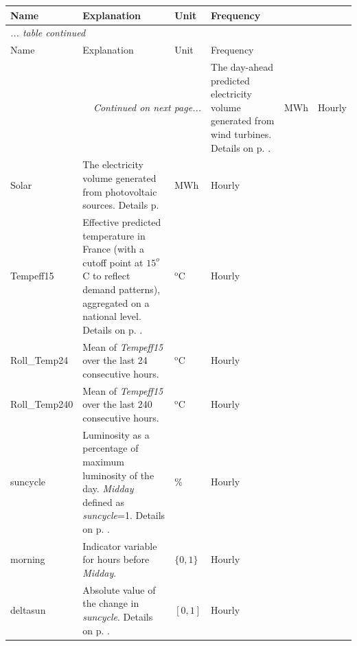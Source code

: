 \begin{center}
\begin{longtable}{p{2cm} p{8.5cm} p{1.3cm}  p{1.5cm}}
 \multicolumn{1}{l}{Name}   & Explanation & Unit  & Frequency \\
\midrule
 \endfirsthead
\multicolumn{3}{l}{\emph{... table \thetable{} continued}} \\
 \multicolumn{1}{l}{Name}   & Explanation  & Unit  & Frequency \\
\midrule
\endhead
\midrule
\multicolumn{3}{r}{\emph{Continued on next page...}}
\endfoot
\endlastfoot
Wind1DA & The day-ahead predicted electricity volume generated from wind turbines. 
Details on p. \pageref{Wind1DA}. & MWh  & Hourly   \\
\midrule 
Solar & The electricity volume generated from photovoltaic sources. 
Details p. \pageref{Solar} & MWh &  Hourly \\  
\midrule
Tempeff15 & 
Effective predicted temperature in France (with a cutoff point at $15^o$C to reflect demand patterns), aggregated on a national level.
Details on p. \pageref{Tempeff15}. & $^\text{o}$C & Hourly\\
\midrule
 Roll\_Temp24 &  Mean of \emph{Tempeff15} over the last 24 consecutive hours. %
  &  $^\text{o}$C   & Hourly \\
\midrule
 Roll\_Temp240 & Mean of \emph{Tempeff15} over the last 240 consecutive hours. %
 &  $^\text{o}$C   & Hourly\\
\midrule
suncycle & Luminosity as a percentage of maximum luminosity of the day. %
\emph{Midday} defined as \emph{suncycle}=1. Details on p. \pageref{suncycle}.  & $\%$ & Hourly\\
\midrule
 morning & Indicator variable for hours before \emph{Midday}. %
 &$ \{0,1\}$ & Hourly\\
\midrule
 deltasun & Absolute value of the change in \emph{suncycle}.  Details on p. \pageref{deltasun}. & $ [0,1]$ & Hourly\\

\end{longtable}
\end{center}
